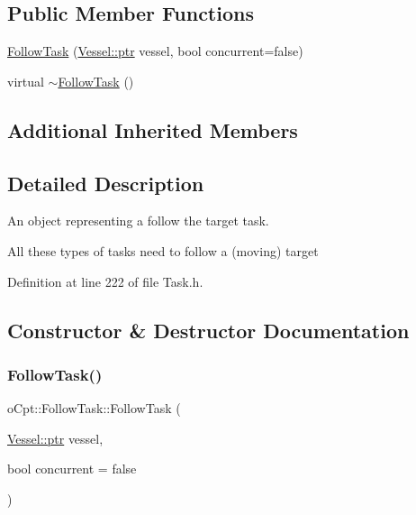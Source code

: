 \subsection*{Public Member Functions}
\begin{DoxyCompactItemize}
\item 
\hyperlink{classo_cpt_1_1_follow_task_a7d19cd508ef042314bb2e3eb87750eab}{Follow\+Task} (\hyperlink{classo_cpt_1_1i_vessel_a43711a596f3bdfd0ca732ed3901edc97}{Vessel\+::ptr} vessel, bool concurrent=false)
\item 
virtual \hyperlink{classo_cpt_1_1_follow_task_ab93d2570c1e65704f6742aa5f3f6a440}{$\sim$\+Follow\+Task} ()
\end{DoxyCompactItemize}
\subsection*{Additional Inherited Members}


\subsection{Detailed Description}
An object representing a follow the target task. 

All these types of tasks need to follow a (moving) target 

Definition at line 222 of file Task.\+h.



\subsection{Constructor \& Destructor Documentation}
\hypertarget{classo_cpt_1_1_follow_task_a7d19cd508ef042314bb2e3eb87750eab}{}\label{classo_cpt_1_1_follow_task_a7d19cd508ef042314bb2e3eb87750eab} 
\subsubsection{\texorpdfstring{Follow\+Task()}{FollowTask()}}
{\footnotesize\ttfamily o\+Cpt\+::\+Follow\+Task\+::\+Follow\+Task (\begin{DoxyParamCaption}\item[{\hyperlink{classo_cpt_1_1i_vessel_a43711a596f3bdfd0ca732ed3901edc97}{Vessel\+::ptr}}]{vessel,  }\item[{bool}]{concurrent = {\ttfamily false} }\end{DoxyParamCaption})}

